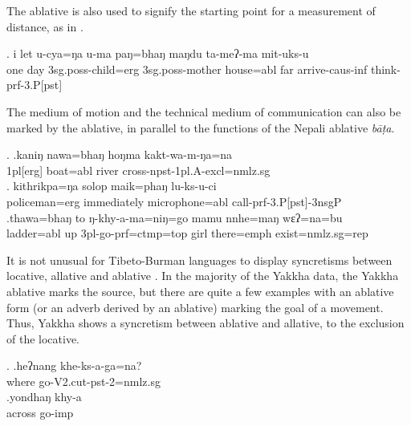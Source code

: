 The ablative is also used to signify the starting point for a measurement of distance, as in \Next.

\exg. i   let u-cya=ŋa              u-ma              paŋ=bhaŋ    maŋdu ta-meʔ-ma             mit-uks-u\\
one day {\sc 3sg.poss-}child{\sc =erg} {\sc 3sg.poss-}mother house{\sc =abl} far arrive{\sc -caus-inf} think{\sc -prf-3.P[pst]}\\

The medium of motion and the technical medium of communication can also be marked by  the ablative,  in parallel to the functions of the Nepali ablative \emph{bāṭa}. 

\ex. \ag.kaniŋ nawa=bhaŋ hoŋma kakt-wa-m-ŋa=na\\
{\sc 1pl[erg]} boat{\sc =abl} river cross{\sc -npst-1pl.A-excl=nmlz.sg}\\
\bg. kithrikpa=ŋa   solop       maik=phaŋ         lu-ks-u-ci\\
policeman{\sc =erg} immediately microphone{\sc =abl} call{\sc -prf-3.P[pst]-3nsgP}\\
\bg.thawa=bhaŋ    to  ŋ-khy-a-ma=niŋ=go                    mamu nnhe=maŋ    wɛʔ=na=bu\\
ladder{\sc =abl} up {\sc 3pl-}go{\sc -prf=ctmp=top} girl there{\sc =emph} exist{\sc [3sg]=nmlz.sg=rep}\\


It is not unusual for Tibeto-Burman languages to display syncretisms between locative, allative and ablative \citep{DeLancey1985_Etymological}. In the majority of the Yakkha data, the Yakkha ablative marks the source, but there are quite a few examples with an ablative form (or an adverb derived by an ablative) marking the goal of a movement. Thus, Yakkha shows a syncretism between ablative and allative, to the exclusion of the locative.

\ex. \ag.heʔnang khe-ks-a-ga=na?\\
where{\sc [abl]} go{\sc -V2.cut-pst-2=nmlz.sg}\\
\bg.yondhaŋ khy-a\\
across{\sc [abl]} go{\sc -imp}\\
\\

